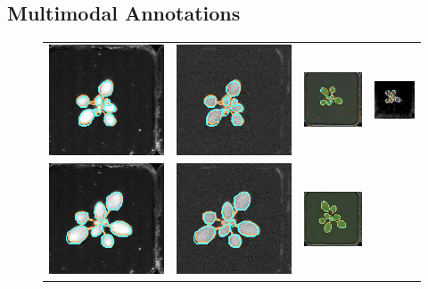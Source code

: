 \subsection{Multimodal Annotations}
\begin{figure}[t]
\begin{centering}
\begin{tabular}{cccc}
\includegraphics[width=.15\textwidth]{Figures/LabelAlignment/day_3_hour_23-seg_ir.png}&
\includegraphics[width=.15\textwidth]{Figures/LabelAlignment/day_3_hour_23-seg_fmp.png}&
\includegraphics[width=.15\textwidth]{Figures/LabelAlignment/day_3_hour_23-seg_rgb.png}&
\includegraphics[width=.15\textwidth]{Figures/LabelAlignment/day_3_hour_23-seg_depth.png}\\
\includegraphics[width=.15\textwidth]{Figures/LabelAlignment/day_5_hour_23-seg_ir.png}&
\includegraphics[width=.15\textwidth]{Figures/LabelAlignment/day_5_hour_23-seg_fmp.png}&
\includegraphics[width=.15\textwidth]{Figures/LabelAlignment/day_5_hour_23-seg_rgb.png}&

\end{tabular}
\end{centering}
\end{figure}
